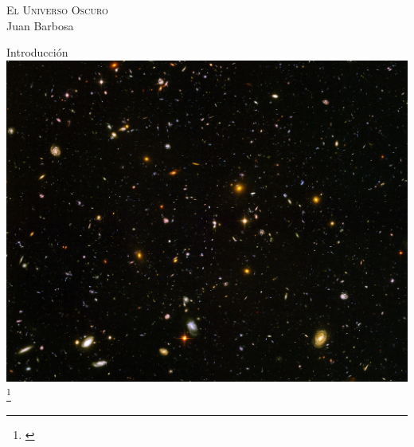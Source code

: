 \documentclass[handout]{beamer}
\newcommand\blfootnote[1]
{%
	\begingroup
	\renewcommand\thefootnote{}\footnote{#1}%
	\addtocounter{footnote}{-1}%
	\endgroup
}
\newcommand{\fcite}[1]{\blfootnote{\cite{#1}}}
\begin{document}
{
	\begin{frame}
		\centering
		\color{white}
		\textsc{\Huge El Universo Oscuro}
		\\
		\vspace{5cm}
		\raggedleft Juan Barbosa
	\end{frame}
}

\begin{frame}{Introducci\'on}
	\centering
	\includegraphics[height = 0.7\textheight]{sources/images/universe.jpg}
	\fcite{boker2002hubble}
\end{frame}
\end{document}
